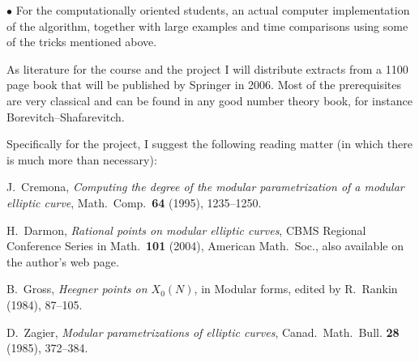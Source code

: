 \documentclass[12pt]{article}
\begin{document}
$\bullet$ For the computationally oriented students, an actual computer
implementation of the algorithm, together with large examples and time
comparisons using some of the tricks mentioned above.

\bigskip

As literature for the course and the project I will distribute extracts from a
1100 page book that will be published by Springer in 2006. Most of the 
prerequisites are very classical and can be found in any good number theory 
book, for instance Borevitch--Shafarevitch. 

Specifically for the project, I suggest the following reading matter
(in which there is much more than necessary):

J.~Cremona, {\it Computing the degree of the modular parametrization of
a modular elliptic curve\/}, Math.~Comp.~{\bf 64} (1995), 1235--1250.

H.~Darmon, {\it Rational points on modular elliptic curves\/}, CBMS 
Regional Conference Series in Math.~{\bf 101} (2004), American Math.~Soc.,
also available on the author's web page.

B.~Gross, {\it Heegner points on $X_0(N)$\/}, in Modular forms, edited by
R.~Rankin (1984), 87--105.

D.~Zagier, {\it Modular parametrizations of elliptic curves\/},
Canad.~Math.~Bull. {\bf 28} (1985), 372--384.
\end{document}
